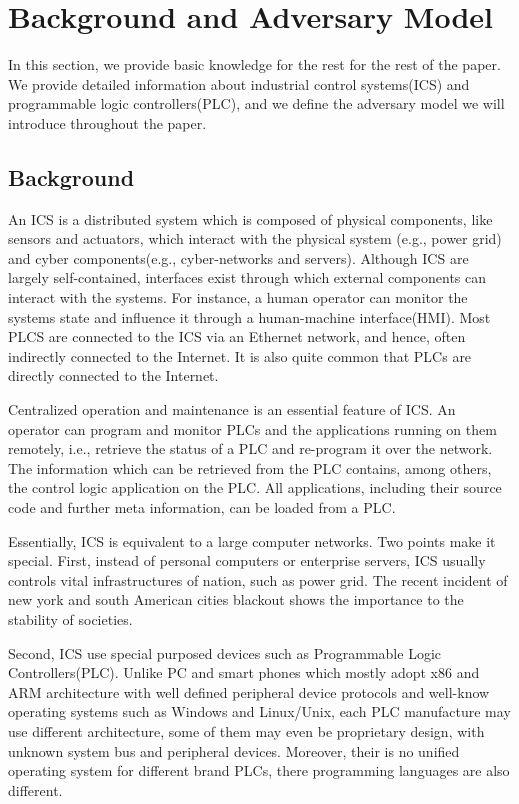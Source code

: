 \section{Background and Adversary Model}
\label{sec:background}

In this section, we provide basic knowledge for the rest for the rest of the paper. We provide detailed information about industrial control systems(ICS) and programmable logic controllers(PLC), and we define the adversary model we will introduce throughout the paper.

\subsection{Background}

An ICS is a distributed system which is composed of physical components, like sensors and actuators, which interact with the physical system (e.g., power grid) and cyber components(e.g., cyber-networks and servers). Although ICS are largely self-contained, interfaces exist through which external components can interact with the systems. For instance, a human operator can monitor the systems state and influence it through a human-machine interface(HMI). Most PLCS are connected to the ICS via an Ethernet network, and hence, often indirectly connected to the Internet. It is also quite common that PLCs are directly connected to the Internet. 

Centralized operation and maintenance is an essential feature of ICS. An operator can program and monitor PLCs and the applications running on them remotely, i.e., retrieve the status of a PLC and re-program it over the network. The information which can be retrieved from the PLC contains, among others, the control logic application on the PLC. All applications, including their source code and further meta information, can be loaded from a PLC.

Essentially, ICS is equivalent to a large computer networks. Two points make it special. First, instead of personal computers or enterprise servers, ICS usually controls vital infrastructures of nation, such as power grid. The recent incident of new york and south American cities blackout shows the importance to the stability of societies.

Second, ICS use special purposed devices such as Programmable Logic Controllers(PLC). Unlike PC and smart phones  which mostly adopt x86 and ARM architecture with well defined peripheral device protocols and well-know operating systems such as Windows and Linux/Unix, each PLC manufacture may use different architecture, some of them may even be proprietary design, with unknown system bus and peripheral devices. Moreover, their is no unified operating system for different brand PLCs, there programming languages are also different.


